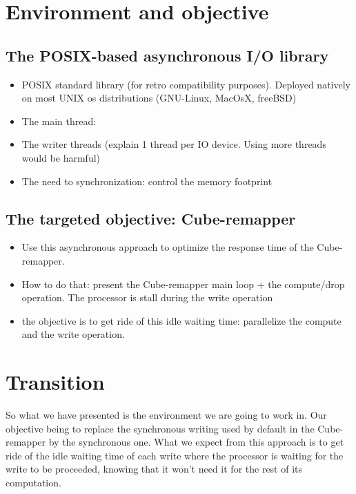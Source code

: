 \documentclass[12pt]{article}											%
\begin{document}
\section{Environment and objective}
	\subsection{The POSIX-based asynchronous I/O library}
		\begin{itemize}
			\item POSIX standard library (for retro compatibility purposes).   Deployed natively on most UNIX os distributions (GNU-Linux, MacOsX, freeBSD)
			\item The main thread:
			\item The writer threads (explain 1 thread per IO device.   Using more threads would be harmful)
			\item The need to synchronization: control the memory footprint
		\end{itemize}



	\subsection{The targeted objective: Cube-remapper}
		\begin{itemize}
			\item Use this asynchronous approach to optimize the response time of the Cube-remapper.
			\item How to do that: present the Cube-remapper main loop + the compute/drop operation.   The processor is stall during the write operation
			\item the objective is to get ride of this idle waiting time: parallelize the compute and the write operation.
		\end{itemize}


\section{Transition}
	So what we have presented is the environment we are going to work in.   Our objective being to replace the synchronous writing used by default in the Cube-remapper by the synchronous one.   What we expect from this approach is to get ride of the idle waiting time of each write where the processor is waiting for the write to be proceeded, knowing that it won't need it for the rest of its computation.\\
\end{document}
